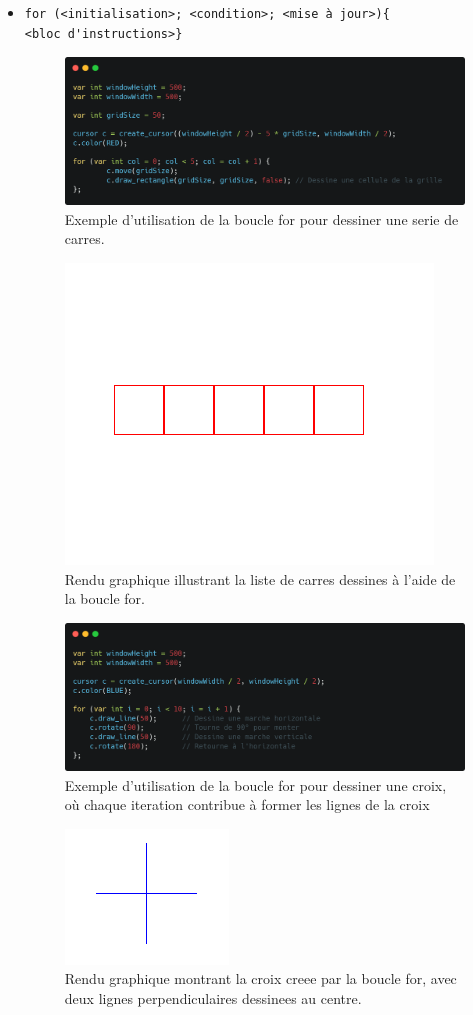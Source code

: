 \documentclass[12pt,a4paper]{report}
\begin{document}
\begin{itemize}
    \item \begin{verbatim}for (<initialisation>; <condition>; <mise à jour>){
<bloc d'instructions>}\end{verbatim}
    \begin{figure}[H]
    \includegraphics[width=1\linewidth]{assets/code/for1_dpp.png}
    \caption{\centering Exemple d'utilisation de la boucle for pour dessiner une serie de carres.}
\end{figure}
\begin{figure}[H]
    \centering
    \includegraphics[width=0.4\linewidth]{assets/render/for.png}
    \caption{\centering Rendu graphique illustrant la liste de carres dessines à l'aide de la boucle for.}
\end{figure}
\begin{figure}[H]
\includegraphics[width=1\linewidth]{assets/code/for2_dpp.png}
\caption{\centering Exemple d'utilisation de la boucle for pour dessiner une croix, où chaque iteration contribue à former les lignes de la croix}
\end{figure}
\begin{figure}[H]
    \centering
    \includegraphics[width=0.3\linewidth]{assets/render/for2.png}
    \caption{\centering Rendu graphique montrant la croix creee par la boucle for, avec deux lignes perpendiculaires dessinees au centre.}
\end{figure}


\end{itemize}
\end{document}
